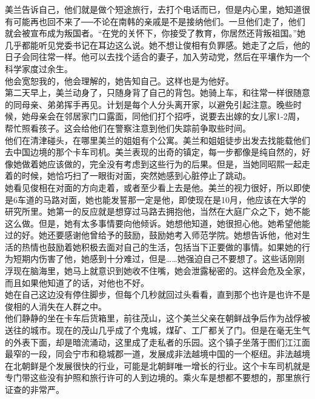 美兰告诉自己，他们就是做个短途旅行，去打个电话而已，但是内心里，她知道很有可能再也回不来了──不论在南韩的亲戚是不是接纳他们。一旦他们走了，他们就会被宣布成为叛国者。“在党的关怀下，你接受了教育，你居然还背叛祖国。”她几乎都能听见党委书记在耳边这么说。她不想让俊相有负罪感。她走了之后，他的日子会同往常一样。他可以去找个适合的妻子，加入劳动党，然后在平壤作为一个科学家度过余生。\\

他会宽恕我的，他会理解的，她告知自己。这样也是为他好。\\

第二天早上，美兰动身了，只随身背了自己的背包。她骑上车，和往常一样很随意的同母亲、弟弟挥手再见。计划是每个人分头离开家，以避免引起注意。晚些时候，她母亲会在邻居家门口露面，同他们打个招呼，说要去出嫁的女儿家1-2周，帮忙照看孩子。这会给他们在警察注意到他们失踪前争取些时间。\\

他们在清津碰头，在哪里美兰的姐姐有个公寓。美兰和姐姐徒步出发去找能载他们去中国边境的那个卡车司机。美兰表现的出奇的镇定，每一步都像是纯自然的，好像她做着她应该做的，完全没有考虑到这些行为的后果。但是，当她同昭熙一起走着的时候，她恰巧扫了一眼街对面，突然她感到心脏停止了跳动。\\

她看见俊相在对面的方向走着，或者至少看上去是他。美兰的视力很好，所以即使是6车道的马路对面，她也能发誓那一定是他，即使现在是10月，他应该在大学的研究所里。她第一的反应就是想穿过马路去拥抱他，当然在大庭广众之下，她不能这么做。但是，她有太多事情要向他倾诉。她想他知道，她很担心他。她希望他能过的好。她还要感谢他曾给予的鼓励，鼓励她考入师范学院。她想告诉他，他对生活的热情也鼓励着她积极去面对自己的生活，包括当下正要做的事情。如果她的行为短期内伤害了他，她感到十分难过，但是……她强迫自己不要想了。这些话刚刚浮现在脑海里，她马上就意识到她收不住嘴，她会泄露秘密的。这样会危及全家，而且如果他知道了的话，对他也不好。\\

她在自己这边没有停住脚步，但每个几秒就回过头看看，直到那个也许是也许不是俊相的人消失在人群之中。\\

他们静静的坐在卡车后货箱里，前往茂山，这个美兰父亲在朝鲜战争后作为战俘被送往的城市。现在的茂山几乎成了个鬼城，煤矿、工厂都关了门。但是在毫无生气的外表下面，却是暗流涌动，这里成了走私者的乐园。这个镇子坐落于图们江江面最窄的一段，同会宁市和稳城郡一道，发展成非法越境中国的一个枢纽。非法越境在北朝鲜是个发展很快的行业，可能是北朝鲜唯一增长的行业。这个卡车司机就是专门带这些没有护照和旅行许可的人到边境的。乘火车是想都不要想的，那里旅行证查的非常严。\\

